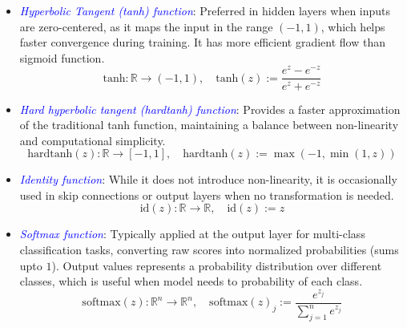 \begin{example}
\begin{itemize}
    \item \textcolor{blue}{\emph{Hyperbolic Tangent (tanh) function}}: Preferred in hidden layers when inputs are zero-centered, as it maps the input in the range $(-1, 1)$, which helps faster convergence during training. It has more efficient gradient flow than sigmoid function.
    \begin{equation}
        \text{tanh}: \mathbb{R} \to (-1,1), \quad \text{tanh}(z) := \frac{e^z-e^{-z}}{e^z+e^{-z}}
        \label{eqn:35}
    \end{equation}
    
    \item \textcolor{blue}{\emph{Hard hyperbolic tangent (hardtanh) function}}: Provides a faster approximation of the traditional tanh function, maintaining a balance between non-linearity and computational simplicity.
    \begin{equation}
        \text{hardtanh}(z): \mathbb{R} \to [-1,1], \quad \text{hardtanh}(z) := \max(-1, \min(1,z))
        \label{eqn:36}
    \end{equation}
    
    \item \textcolor{blue}{\emph{Identity function}}: While it does not introduce non-linearity, it is occasionally used in skip connections or output layers when no transformation is needed.
    \begin{equation}
        \text{id}(z): \mathbb{R} \to \mathbb{R}, \quad \text{id}(z) := z
        \label{eqn:37}
    \end{equation}
    
    \item \textcolor{blue}{\emph{Softmax function}}: Typically applied at the output layer for multi-class classification tasks, converting raw scores into normalized probabilities (sums upto $1$). Output values represents a probability distribution over different classes, which is useful when model needs to probability of each class.
    \begin{equation}
        \text{softmax}(z) : \mathbb{R}^n \to \mathbb{R}^n, \quad \text{softmax}(z)_j := \frac{e^{z_j}}{\sum_{j=1}^n e^{z_j}}
        \label{eqn:38}
    \end{equation}
\end{itemize}

\end{example}

